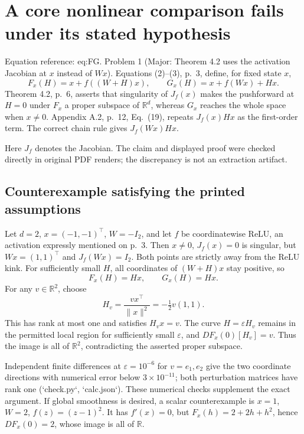 \documentclass[10pt]{article}
\begin{document}
\section*{A core nonlinear comparison fails under its stated hypothesis}
Equation reference: eq:FG. Problem 1 (Major: Theorem 4.2 uses the activation Jacobian at \(x\) instead of \(Wx\)).  Equations (2)–(3), p. 3, define, for fixed state \(x\), \[
F_x(H)=x+f((W+H)x),\qquad G_x(H)=x+f(Wx)+Hx.\] Theorem 4.2, p. 6, asserts that singularity of \(J_f(x)\) makes the pushforward at \(H=0\) under \(F_x\) a proper subspace of \(\mathbb R^d\), whereas \(G_x\) reaches the whole space when \(x\ne0\). Appendix A.2, p. 12, Eq. (19), repeats \(J_f(x)Hx\) as the first-order term. The correct chain rule gives \(J_f(Wx)Hx\).\par
Here \(J_f\) denotes the Jacobian. The claim and displayed proof were checked directly in original PDF renders; the discrepancy is not an extraction artifact.\par
\subsection*{Counterexample satisfying the printed assumptions}
Let \(d=2\), \(x=(-1,-1)^\top\), \(W=-I_2\), and let \(f\) be coordinatewise ReLU, an activation expressly mentioned on p. 3. Then \(x\ne0\), \(J_f(x)=0\) is singular, but \(Wx=(1,1)^\top\) and \(J_f(Wx)=I_2\). Both points are strictly away from the ReLU kink. For sufficiently small \(H\), all coordinates of \((W+H)x\) stay positive, so \[F_x(H)=Hx,\qquad G_x(H)=Hx.\] For any \(v\in\mathbb R^2\), choose \[H_v=\frac{vx^\top}{\|x\|^2}=-\tfrac12v(1,1).\] This has rank at most one and satisfies \(H_vx=v\). The curve \(H=\varepsilon H_v\) remains in the permitted local region for sufficiently small \(\varepsilon\), and \(DF_x(0)[H_v]=v\). Thus the image is all of \(\mathbb R^2\), contradicting the asserted proper subspace.\par
Independent finite differences at \(\varepsilon=10^{-6}\) for \(v=e_1,e_2\) give the two coordinate directions with numerical error below \(3\times10^{-11}\); both perturbation matrices have rank one (`check.py`, `calc.json`). These numerical checks supplement the exact argument. If global smoothness is desired, a scalar counterexample is \(x=1\), \(W=2\), \(f(z)=(z-1)^2\). It has \(f'(x)=0\), but \(F_x(h)=2+2h+h^2\), hence \(DF_x(0)=2\), whose image is all of \(\mathbb R\).\par
\end{document}
